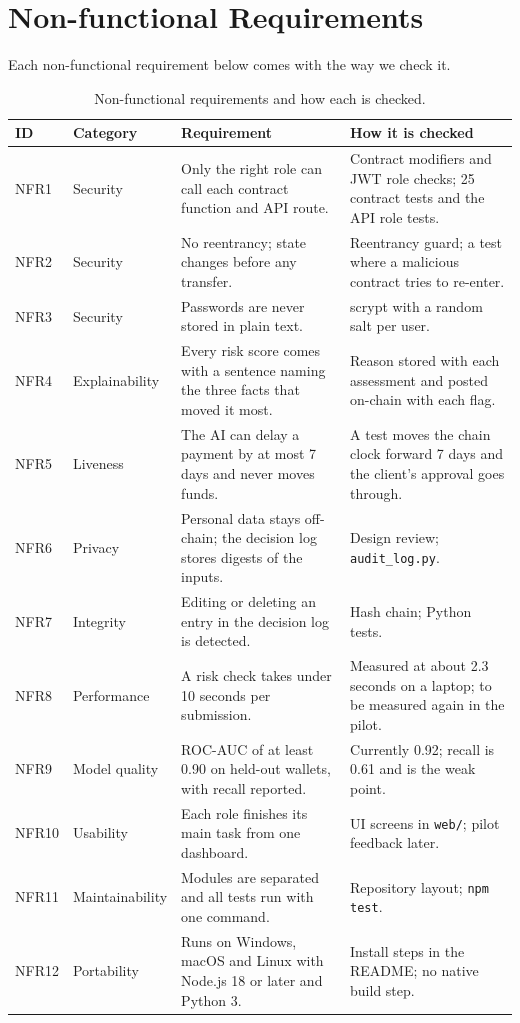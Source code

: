 \chapter{Non-functional Requirements}
\label{ch:nfr}

Each non-functional requirement below comes with the way we check it.

\begin{table}[htbp]
\centering
\footnotesize
\renewcommand{\arraystretch}{1.15}
\begin{tabularx}{\textwidth}{>{\raggedright\arraybackslash}p{1.1cm}>{\raggedright\arraybackslash}p{2.2cm}L>{\raggedright\arraybackslash}p{4.3cm}}
\hline
\textbf{ID} & \textbf{Category} & \textbf{Requirement} & \textbf{How it is checked} \\ \hline
NFR1 & Security & Only the right role can call each contract function and API route. & Contract modifiers and JWT role checks; 25 contract tests and the API role tests. \\
NFR2 & Security & No reentrancy; state changes before any transfer. & Reentrancy guard; a test where a malicious contract tries to re-enter. \\
NFR3 & Security & Passwords are never stored in plain text. & scrypt with a random salt per user. \\
NFR4 & Explainability & Every risk score comes with a sentence naming the three facts that moved it most. & Reason stored with each assessment and posted on-chain with each flag. \\
NFR5 & Liveness & The AI can delay a payment by at most 7 days and never moves funds. & A test moves the chain clock forward 7 days and the client's approval goes through. \\
NFR6 & Privacy & Personal data stays off-chain; the decision log stores digests of the inputs. & Design review; \texttt{audit\_log.py}. \\
NFR7 & Integrity & Editing or deleting an entry in the decision log is detected. & Hash chain; Python tests. \\
NFR8 & Performance & A risk check takes under 10 seconds per submission. & Measured at about 2.3 seconds on a laptop; to be measured again in the pilot. \\
NFR9 & Model quality & ROC-AUC of at least 0.90 on held-out wallets, with recall reported. & Currently 0.92; recall is 0.61 and is the weak point. \\
NFR10 & Usability & Each role finishes its main task from one dashboard. & UI screens in \texttt{web/}; pilot feedback later. \\
NFR11 & Maintainability & Modules are separated and all tests run with one command. & Repository layout; \texttt{npm test}. \\
NFR12 & Portability & Runs on Windows, macOS and Linux with Node.js 18 or later and Python 3. & Install steps in the README; no native build step. \\ \hline
\end{tabularx}
\caption{Non-functional requirements and how each is checked.}
\label{tab:nfr}
\end{table}

